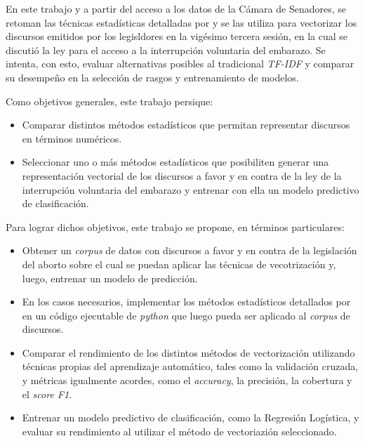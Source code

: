 En este trabajo y a partir del acceso a los datos de la C\'amara de Senadores,
se retoman las t\'ecnicas estad\'isticas detalladas por
\citeauthor{monroe2008fightin} y se las utiliza para vectorizar los
discursos emitidos por los legisldores en la vig\'esimo tercera sesi\'on,
en la cual se discuti\'o la ley para el acceso a
la interrupci\'on voluntaria del embarazo.
Se intenta, con esto, evaluar alternativas posibles al tradicional \textit{TF-IDF}
y comparar su desempeño en la selecci\'on de rasgos y entrenamiento de modelos.

Como objetivos generales, este trabajo persique:

\begin{itemize}
    \item{Comparar distintos m\'etodos estad\'isticos que permitan representar
    discursos en t\'erminos num\'ericos.}
    \item{Seleccionar uno o m\'as m\'etodos estad\'isticos que posibiliten
    generar una representaci\'on vectorial de los discursos a favor y en
    contra de la ley de la interrupci\'on voluntaria del embarazo y entrenar
    con ella un modelo predictivo de clasificaci\'on.}
\end{itemize}

Para lograr dichos objetivos, este trabajo se propone, en t\'erminos
particulares:

\begin{itemize}
    \item{Obtener un \textit{corpus} de datos con discursos a favor y en contra
    de la legislaci\'on del aborto sobre el cual se puedan aplicar las t\'ecnicas de
    vecotrizaci\'on y, luego, entrenar un modelo de predicci\'on.}
    \item{En los casos necesarios, implementar los m\'etodos estad\'isticos detallados
    por \cite{monroe2008fightin} en un c\'odigo ejecutable de \textit{python} que
    luego pueda ser aplicado al \textit{corpus} de discursos.}
    \item{Comparar el rendimiento de los distintos m\'etodos de vectorizaci\'on utilizando
    t\'ecnicas propias del aprendizaje autom\'atico, tales como la validaci\'on
    cruzada, y m\'etricas igualmente acordes, como el \textit{accuracy}, la precisi\'on,
    la cobertura y el \textit{score F1}.}
    \item{Entrenar un modelo predictivo de clasificaci\'on, como la Regresi\'on Log\'istica,
    y evaluar su rendimiento al utilizar el m\'etodo de vectoriazi\'on seleccionado.}
\end{itemize}

